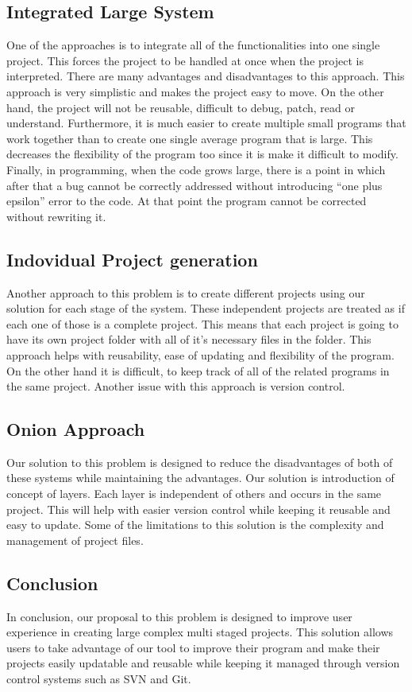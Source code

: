\documentclass[journal,10pt,onecolumn,compsoc]{IEEEtran} \usepackage[margin=1.0in]{geometry} \usepackage{pdfpages} \usepackage{graphicx}
\begin{document}
\subsection{Integrated Large System}
One of the approaches is to integrate all of the functionalities into one single project. 
This forces the project to be handled at once when the project is interpreted. 
There are many advantages and disadvantages to this approach. 
This approach is very simplistic and makes the project easy to move. 
On the other hand, the project will not be reusable, difficult to debug, patch, read or understand. 
Furthermore, it is much easier to create multiple small programs that work together than to create one single average program that is large. 
This decreases the flexibility of the program too since it is make it difficult to modify. 
Finally, in programming, when the code grows large, there is a point in which after that a bug cannot be correctly addressed without introducing “one plus epsilon” error to the code. 
At that point the program cannot be corrected without rewriting it.

\subsection{Indovidual Project generation}
Another approach to this problem is to create different projects using our solution for each stage of the system. 
These independent projects are treated as if each one of those is a complete project. 
This means that each project is going to have its own project folder with all of it’s necessary files in the folder. 
This approach helps with reusability, ease of updating and flexibility of the program. On the other hand it is difficult, to keep track of all of the related programs in the same project. 
Another issue with this approach is version control. 

\subsection{Onion Approach}
Our solution to this problem is designed to reduce the disadvantages of both of these systems while maintaining the advantages. 
Our solution is introduction of concept of layers. 
Each layer is independent of others and occurs in the same project. 
This will help with easier version control while keeping it reusable and easy to update. 
Some of the limitations to this solution is the complexity and management of project files. 

\subsection{Conclusion}
In conclusion, our proposal to this problem is designed to improve user experience in creating large complex multi staged projects. 
This solution allows users to take advantage of our tool to improve their program and make their projects easily updatable and reusable while keeping it managed through version control systems such as SVN and Git.
\newpage
\end{document}

